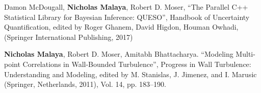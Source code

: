 
Damon McDougall, \textbf{Nicholas Malaya}, Robert D. Moser, ``The Parallel C++
Statistical Library for Bayesian Inference: QUESO'', Handbook of
Uncertainty Quantification, edited by Roger Ghanem, David Higdon, Houman
Owhadi, (Springer International Publishing, 2017) 

\blankline

\textbf{Nicholas Malaya}, Robert D. Moser, Amitabh Bhattacharya. ``Modeling
Multi-point Correlations in Wall-Bounded Turbulence'', Progress in Wall
Turbulence: Understanding and Modeling, edited by M. Stanislas,
J. Jimenez, and I. Marusic (Springer, Netherlands, 2011), Vol. 14,
pp. 183–190.  